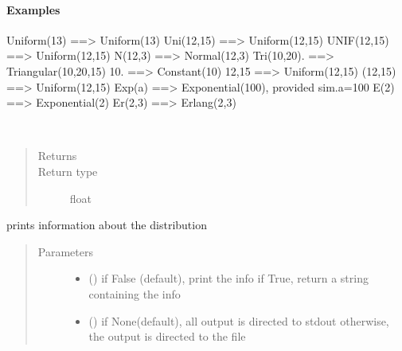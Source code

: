 \documentclass[letterpaper,10pt,english]{sphinxmanual}
\begin{document}
\begin{fulllineitems}
\paragraph{Examples}

Uniform(13)  ==\textgreater{} Uniform(13) 
Uni(12,15)   ==\textgreater{} Uniform(12,15) 
UNIF(12,15)  ==\textgreater{} Uniform(12,15) 
N(12,3)      ==\textgreater{} Normal(12,3) 
Tri(10,20).  ==\textgreater{} Triangular(10,20,15) 
10.          ==\textgreater{} Constant(10) 
12,15        ==\textgreater{} Uniform(12,15) 
(12,15)      ==\textgreater{} Uniform(12,15) 
Exp(a)       ==\textgreater{} Exponential(100), provided sim.a=100 
E(2)         ==\textgreater{} Exponential(2)
Er(2,3)      ==\textgreater{} Erlang(2,3)

\begin{fulllineitems}
\label{\detokenize{Reference:salabim.Distribution.mean}}~\begin{quote}\begin{description}
\item[{Returns}] \leavevmode
{}

\item[{Return type}] \leavevmode
float

\end{description}\end{quote}

\end{fulllineitems}


\begin{fulllineitems}
\label{\detokenize{Reference:salabim.Distribution.print_info}}
prints information about the distribution
\begin{quote}\begin{description}
\item[{Parameters}] \leavevmode\begin{itemize}
\item {} 
 () \textendash{} if False (default), print the info
if True, return a string containing the info

\item {} 
 () \textendash{} if None(default), all output is directed to stdout 
otherwise, the output is directed to the file


\end{itemize}
\end{description}
\end{quote}
\end{fulllineitems}
\end{fulllineitems}
\end{document}
